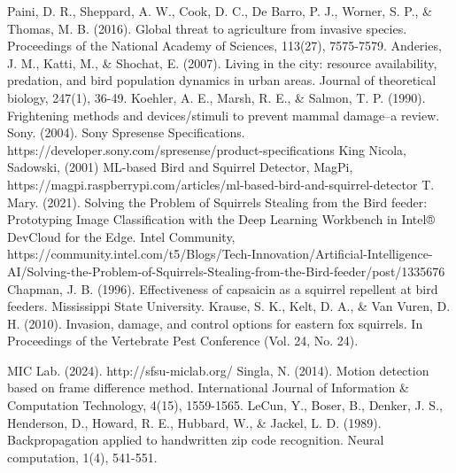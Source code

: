 \documentclass[conference]{IEEEtran}
\begin{document}
\begin{thebibliography}{00}
  Paini, D. R., Sheppard, A. W., Cook, D. C., De Barro, P. J., Worner, S. P., \& Thomas, M. B. (2016). Global threat to agriculture from invasive species. Proceedings of the National Academy of Sciences, 113(27), 7575-7579.
 Anderies, J. M., Katti, M., \& Shochat, E. (2007). Living in the city: resource availability, predation, and bird population dynamics in urban areas. Journal of theoretical biology, 247(1), 36-49.
 Koehler, A. E., Marsh, R. E., \& Salmon, T. P. (1990). Frightening methods and devices/stimuli to prevent mammal damage--a review.
 Sony. (2004). Sony Spresense Specifications. https://developer.sony.com/spresense/product-specifications 
  King Nicola, Sadowski, (2001) ML-based Bird and Squirrel Detector, MagPi, https://magpi.raspberrypi.com/articles/ml-based-bird-and-squirrel-detector
  T. Mary. (2021). Solving the Problem of Squirrels Stealing from the Bird feeder: Prototyping Image Classification with the Deep Learning Workbench in Intel® DevCloud for the Edge. Intel Community, https://community.intel.com/t5/Blogs/Tech-Innovation/Artificial-Intelligence-AI/Solving-the-Problem-of-Squirrels-Stealing-from-the-Bird-feeder/post/1335676
 Chapman, J. B. (1996). Effectiveness of capsaicin as a squirrel repellent at bird feeders. Mississippi State University.
 Krause, S. K., Kelt, D. A., \& Van Vuren, D. H. (2010). Invasion, damage, and control options for eastern fox squirrels. In Proceedings of the Vertebrate Pest Conference (Vol. 24, No. 24). 

 MIC Lab. (2024). http://sfsu-miclab.org/ 
 Singla, N. (2014). Motion detection based on frame difference method. International Journal of Information \& Computation Technology, 4(15), 1559-1565. 
 LeCun, Y., Boser, B., Denker, J. S., Henderson, D., Howard, R. E., Hubbard, W., \& Jackel, L. D. (1989). Backpropagation applied to handwritten zip code recognition. Neural computation, 1(4), 541-551. 
\end{thebibliography}
\end{document}
